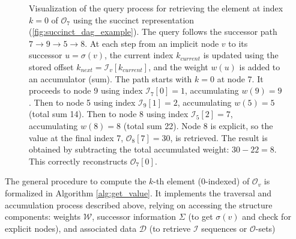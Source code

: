 \begin{figure}[htbp]
    \caption{Visualization of the query process for retrieving the element at index $k=0$ of $\mathcal{O}_7$ using the succinct representation (\autoref{fig:succinct_dag_example}). The query follows the successor path $7 \to 9 \to 5 \to 8$. At each step from an implicit node $v$ to its successor $u=\sigma(v)$, the current index $k_{current}$ is updated using the stored offset $k_{next} = \mathcal{I}_v[k_{current}]$, and the weight $w(u)$ is added to an accumulator (sum). The path starts with $k=0$ at node 7. It proceeds to node 9 using index $\mathcal{I}_7[0]=1$, accumulating $w(9)=9$. Then to node 5 using index $\mathcal{I}_9[1]=2$, accumulating $w(5)=5$ (total sum 14). Then to node 8 using index $\mathcal{I}_5[2]=7$, accumulating $w(8)=8$ (total sum 22). Node 8 is explicit, so the value at the final index 7, $\mathcal{O}_8[7]=30$, is retrieved. The result is obtained by subtracting the total accumulated weight: $30 - 22 = 8$. This correctly reconstructs $\mathcal{O}_7[0]$.}
    \label{fig:query_path_node7}
\end{figure}

The general procedure to compute the $k$-th element ($0$-indexed) of $\mathcal{O}_v$ is formalized in Algorithm \ref{alg:get_value}. It implements the traversal and accumulation process described above, relying on accessing the structure components: weights $\mathcal{W}$, successor information $\Sigma$ (to get $\sigma(v)$ and check for explicit nodes), and associated data $\mathcal{D}$ (to retrieve $\mathcal{I}$ sequences or $\mathcal{O}$-sets)


